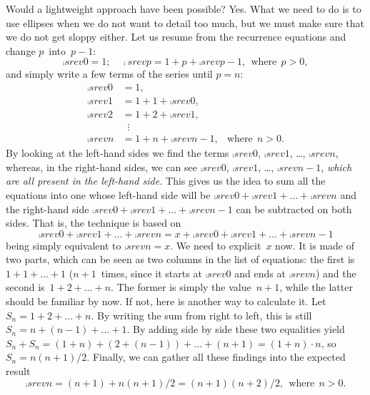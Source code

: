 Would a lightweight approach have been possible? Yes. What we need to
do is to use ellipses when we do not want to detail too much, but we
must make sure that we do not get sloppy either. Let us resume from
the recurrence equations and change \(p\)~into~\(p-1\):
\begin{equation}
\comp{srev}{0} = 1;\quad
\comp{srev}{p} = 1 + p + \comp{srev}{p-1},\,\; \text{where}\;\, p >
0,\label{eq:srev_p}
\end{equation}
and simply write a few terms of the series until \(p=n\):
\begin{align*}
\comp{srev}{0} &= 1,\\
\comp{srev}{1} &= 1 + 1 + \comp{srev}{0},\\
\comp{srev}{2} &= 1 + 2 + \comp{srev}{1},\\
&\;\;\vdots\\
\comp{srev}{n} &= 1 + n + \comp{srev}{n-1}, & \text{where}\;\, n >
0.
\end{align*}
By looking at the left\hyp{}hand sides we find the terms
\(\comp{srev}{0}\), \(\comp{srev}{1}\), \dots, \(\comp{srev}{n}\),
whereas, in the right\hyp{}hand sides, we can see \(\comp{srev}{0}\),
\(\comp{srev}{1}\), \dots, \(\comp{srev}{n-1}\), \emph{which are all
  present in the left\hyp{}hand side.} This gives us the idea to sum
all the equations into one whose left\hyp{}hand side will be
\(\comp{srev}{0} + \comp{srev}{1} + \dots + \comp{srev}{n}\) and the
right\hyp{}hand side \(\comp{srev}{0} + \comp{srev}{1} + \dots +
\comp{srev}{n-1}\) can be subtracted on both sides. That is, the
technique is based on
\[
\comp{srev}{0} + \comp{srev}{1} + \dots + \comp{srev}{n} = x +
\comp{srev}{0} + \comp{srev}{1} + \dots + \comp{srev}{n-1}
\]
being simply equivalent to \(\comp{srev}{n} = x\). We need to
explicit~\(x\) now. It is made of two parts, which can be seen as two
columns in the list of equations: the first is \(1 + 1 + \dots + 1\)
(\(n+1\)~times, since it starts at \(\comp{srev}{0}\) and ends at
\(\comp{srev}{n}\)) and the second is~\(1 + 2 + \dots + n\). The
former is simply the value~\(n+1\), while the latter should be
familiar by now. If not, here is another way to calculate it. Let
\(S_n = 1 + 2 + \dots + n\). By writing the sum from right to left,
this is still \(S_n = n + (n-1) + \dots + 1\). By adding side by side
these two equalities yield \(S_n + S_n = (1 + n) + (2 + (n-1)) + \dots
+ (n + 1) = (1 + n) \cdot n\), so \(S_n = n(n+1)/2\). Finally, we can
gather all these findings into the expected result
\[
\comp{srev}{n} = (n+1) + n(n+1)/2 = (n+1)(n+2)/2, \,\;
\text{where}\;\, n > 0.
\]
